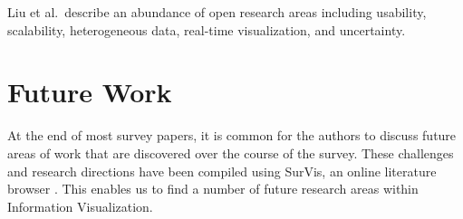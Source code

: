 
Liu et al.\ describe an abundance of open research areas including usability, scalability, heterogeneous data, real-time visualization, and uncertainty.










\section{Future Work}
At the end of most survey papers, it is common for the authors to discuss future areas of work that are discovered over the course of the survey. These challenges and research directions have been compiled using SurVis, an online literature browser \cite{beck2016visual,surVis}. This enables us to find a number of future research areas within Information Visualization.

